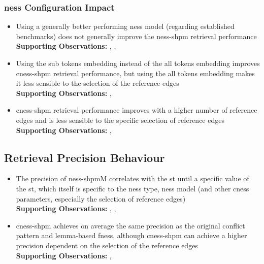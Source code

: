 \documentclass[11pt, numbers=noenddot]{scrreprt}
\begin{document}
\subsubsection{\gls{ness} Configuration Impact}

\begin{itemize}

\item Using a generally better performing \gls{ness} model (regarding established benchmarks) does not generally improve the \gls{ness-shpm} retrieval performance \\
\textbf{Supporting Observations:} , , 

\item Using the sub tokens embedding instead of the all tokens embedding improves \gls{cness-shpm} retrieval performance, but using the all tokens embedding makes it less sensible to the selection of the reference edges
\\ \textbf{Supporting Observations:} , 

\item \gls{cness-shpm} retrieval performance improves with a higher number of reference edges and is less sensible to the specific selection of reference edges
\\ \textbf{Supporting Observations:} , 

\end{itemize}


\subsection{Retrieval Precision Behaviour}
\label{sec:result-retrieval-precision-behaviour}

\begin{itemize}
	\item The precision of \gls{ness-shpm}M correlates with the \gls{st} until a specific value of the \gls{st}, which itself is specific to the \gls{ness} type, \gls{ness} model (and other \gls{cness} parameters, especially the selection of reference edges)
\\ \textbf{Supporting Observations:} , , 

\item \gls{cness-shpm} achieves on average the same precision as the original conflict pattern and lemma-based \gls{fness}, although \gls{cness-shpm} can achieve a higher precision dependent on the selection of the reference edges \\
\textbf{Supporting Observations:} , 


\end{itemize}
\end{document}
